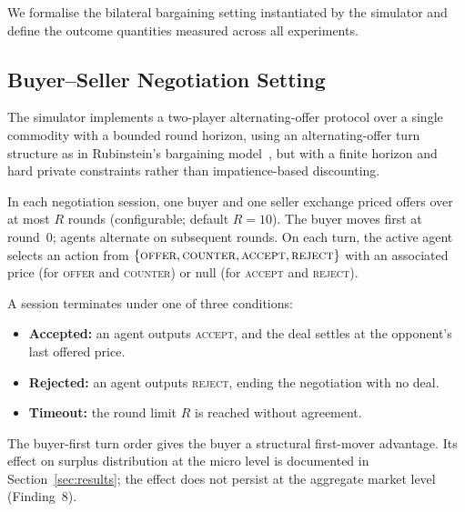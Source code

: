 
\label{sec:formulation}

We formalise the bilateral bargaining setting instantiated by the simulator and define the outcome quantities measured across all experiments.

\subsection{Buyer--Seller Negotiation Setting}
\label{sec:setting}

The simulator implements a two-player alternating-offer protocol over a single commodity with a bounded round horizon, using an alternating-offer turn structure as in Rubinstein's bargaining model~\cite{rubinstein1982}, but with a finite horizon and hard private constraints rather than impatience-based discounting.

In each negotiation session, one buyer and one seller exchange priced offers over at most $R$ rounds (configurable; default $R{=}10$).  The buyer moves first at round~0; agents alternate on subsequent rounds.  On each turn, the active agent selects an action from $\{\textsc{offer}, \textsc{counter}, \textsc{accept}, \textsc{reject}\}$ with an associated price (for \textsc{offer} and \textsc{counter}) or null (for \textsc{accept} and \textsc{reject}).

A session terminates under one of three conditions:
\begin{itemize}
    \item \textbf{Accepted:} an agent outputs \textsc{accept}, and the deal settles at the opponent's last offered price.
    \item \textbf{Rejected:} an agent outputs \textsc{reject}, ending the negotiation with no deal.
    \item \textbf{Timeout:} the round limit $R$ is reached without agreement.
\end{itemize}

The buyer-first turn order gives the buyer a structural first-mover advantage.  Its effect on surplus distribution at the micro level is documented in Section~\ref{sec:results}; the effect does not persist at the aggregate market level (Finding~8).

